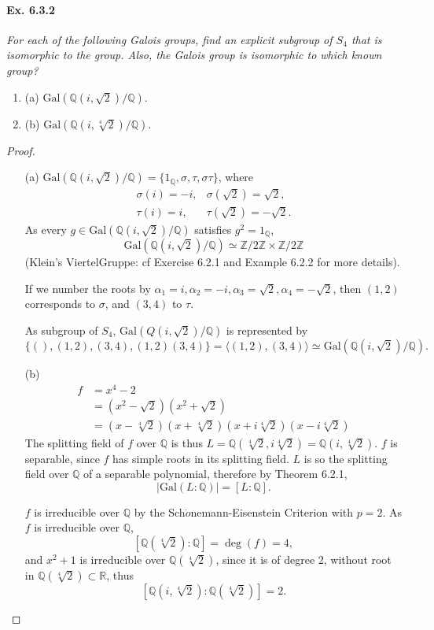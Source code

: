 \documentclass[11pt,a4paper]{article}
\newcommand{\be} {\begin{enumerate}}
\newcommand{\ee} {\end{enumerate}}
\newcommand{\Q}{\mathbb{Q}}
\newcommand{\Z}{\mathbb{Z}}
\newcommand{\R}{\mathbb{R}}
\newcommand{\Gal}{\mathrm{Gal}}
\begin{document}
\paragraph{Ex. 6.3.2}

{\it For each of the following Galois groups, find an explicit subgroup of $S_4$ that is isomorphic to the group. Also, the Galois group is isomorphic to which known group? 
\be
\item[(a)] $\Gal(\Q(i,\sqrt{2})/\Q)$.
\item[(b)] $\Gal(\Q(i,\sqrt[4]{2})/\Q)$.
\ee
}

\begin{proof}
\begin{enumerate}
\item[(a)]
$\Gal(\Q(i,\sqrt{2})/\Q) = \{1_{\Q}, \sigma, \tau, \sigma\tau\}$, where
$$
\begin{array}{ll}
\sigma(i) = -i, &\sigma(\sqrt{2}) = \sqrt{2},\\
\tau(i) = i, &\tau(\sqrt{2}) = -\sqrt{2}.
\end{array}
$$
As every  $g \in \Gal(\Q(i,\sqrt{2})/\Q)$  satisfies $g^2 = 1_{\Q}$, 
$$\Gal(\Q(i,\sqrt{2})/\Q) \simeq \Z/2\Z \times \Z/2\Z$$
(Klein's ViertelGruppe: cf Exercise 6.2.1 and Example 6.2.2 for more details).

If we number the roots by $\alpha_1 = i, \alpha_2 = -i, \alpha_3 = \sqrt{2}, \alpha_4 = -\sqrt{2}$, then $(1,2)$ corresponds to $\sigma$, and $(3,4)$ to $\tau$.

As subgroup of $S_4$, $\Gal(Q(i,\sqrt{2})/\Q)$ is represented by $$\{ (), (1,2), (3,4), (1,2)(3,4)\} = \langle (1,2),(3,4) \rangle \simeq \Gal(\Q(i,\sqrt{2})/\Q).$$

\item[(b)]
 \begin{align*}
 f&=x^4-2\\
 &=(x^2-\sqrt{2})(x^2+\sqrt{2})\\
 &=(x-\sqrt[4]{2})(x+\sqrt[4]{2})(x+i\sqrt[4]{2})(x-i\sqrt[4]{2})
\end{align*}
The splitting field of $f$ over $\Q$ is thus $L = \Q(\sqrt[4]{2},i\sqrt[4]{2}) = \Q(i,\sqrt[4]{2})$. $f$ is separable, since $f$ has simple roots in its splitting field. $L$ is so the splitting field over $\Q$ of a separable  polynomial, therefore by Theorem 6.2.1,$$\vert \Gal(L:\Q) \vert= [L:\Q].$$

$f$ is irreducible over $\Q$ by the Sch$\ddot o$nemann-Eisenstein Criterion with $p=2$.
As $f$ is irreducible over $\Q$, $$[\Q(\sqrt[4]{2}) : \Q] = \deg(f) = 4,$$ and $x^2+1$ is irreducible over $\Q(\sqrt[4]{2})$, since it is of degree 2, without root in $\Q(\sqrt[4]{2}) \subset \R$, thus $${[\Q(i,\sqrt[4]{2}) : \Q(\sqrt[4]{2})] = 2}.$$


\end{enumerate}
\end{proof}
\end{document}
